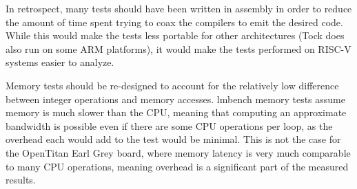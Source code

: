 \documentclass{article}
\begin{document}

In retrospect, many tests should have been written in assembly in order to reduce the amount of time spent trying to coax the compilers to emit the desired code. While this would make the tests less portable for other architectures (Tock does also run on some ARM platforms), it would make the tests performed on RISC-V systems easier to analyze.

Memory tests should be re-designed to account for the relatively low difference between integer operations and memory accesses. lmbench memory tests assume memory is much slower than the CPU, meaning that computing an approximate bandwidth is possible even if there are some CPU operations per loop, as the overhead each would add to the test would be minimal. This is not the case for the OpenTitan Earl Grey board, where memory latency is very much comparable to many CPU operations, meaning overhead is a significant part of the measured results.
\end{document}
